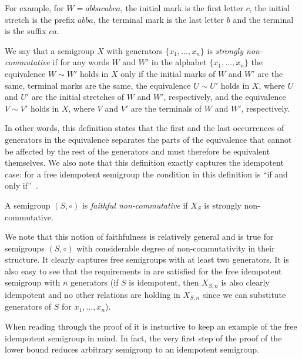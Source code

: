 \documentclass{toc}
\begin{document}
For example, for $W = abbacabca$, the initial mark is the first letter $c$, the 
initial stretch %
is
the prefix $abba$, the terminal mark is the last letter $b$ and the terminal is the suffix $ca$.

\begin{definition}\label{def:strong_non_commutativity}
We say that a semigroup $X$ with generators $\{x_1,\ldots, x_n\}$ is
\emph{strongly non-commutative} if for any words $W$ and $W'$ in the
alphabet $\{x_1,\ldots, x_n\}$ the equivalence $W\sim W'$ holds in $X$ only if
the initial marks of $W$ and $W'$ are the same, terminal marks are the same,
the equivalence $U \sim U'$ holds in $X$, where $U$ and $U'$ are the 
initial stretches %
of
$W$ and $W'$, respectively, and the equivalence $V \sim V'$ holds in $X$, where
$V$ and $V'$ are the terminals of $W$ and $W'$, respectively.
\end{definition}

In other words, this definition states that the first and the last occurrences
of generators in the equivalence separates the parts of the equivalence that
cannot be affected by the rest of the generators and must therefore be
equivalent themselves. We also note that this definition exactly captures the
idempotent case: for a free idempotent semigroup the condition in this
definition is ``if and only if''~\cite{GreenR52}.

\begin{definition}
	\label{def:faithful}
	A semigroup $(S, \circ)$ is \emph{faithful non-commutative} if $X_S$ is strongly
	non-commutative.
\end{definition}

We note that this notion of faithfulness is relatively general and is true for
semigroups $(S,\circ)$ with considerable degree of non-commutativity in their
structure. It clearly captures free semigroups with at least two generators. It
is also easy to see that the
requirements in  are satisfied for the free
idempotent semigroup with $n$ generators (if $S$ is idempotent, then $X_{S,n}$
is also clearly idempotent and no other relations are holding in $X_{S,n}$ since
we can substitute generators of $S$ for $x_1, \ldots, x_n$).

When reading through the proof of  it is instuctive to keep an example of the free idempotent semigroup in mind. In fact, the very first step of the proof of the lower bound reduces arbitrary semigroup to an idempotent semigroup.
\end{document}
